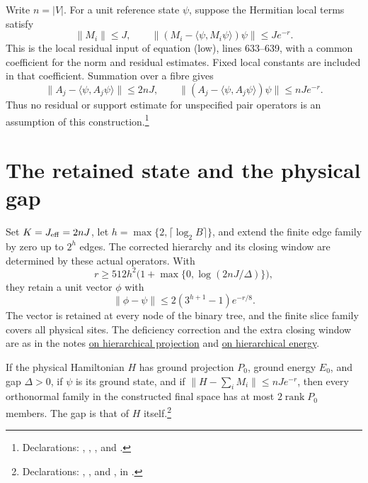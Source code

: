 \documentclass{article}
\begin{document}
Write $n=|V|$. For a unit reference state $\psi$, suppose the Hermitian
local terms satisfy
\[
 \|M_i\|\le J,\qquad
 \|(M_i-\langle\psi,M_i\psi\rangle)\psi\|\le Je^{-r}.
\]
This is the local residual input of equation (low), lines 633--639, with
a common coefficient for the norm and residual estimates. Fixed local
constants are included in that coefficient. Summation over a fibre gives
\[
 \|A_j-\langle\psi,A_j\psi\rangle\|\le2nJ,
 \qquad
 \|(A_j-\langle\psi,A_j\psi\rangle)\psi\|\le nJe^{-r}.
\]
Thus no residual or support estimate for unspecified pair operators is
an assumption of this construction.\footnote{Declarations:
,
,
, and
.}

\section{The retained state and the physical gap}

Set $K=J_{\rm eff}=2nJ$, let
$h=\max\{2,\lceil\log_2 B\rceil\}$, and extend the finite edge family by
zero up to $2^h$ edges. The corrected hierarchy and its closing window
are determined by these actual operators. With
\[
 r\ge512h^2\bigl(1+\max\{0,\log(2nJ/\Delta)\}\bigr),
\]
they retain a unit vector $\phi$ with
\[
 \|\phi-\psi\|\le2(3^{h+1}-1)e^{-r/8}.
\]
The vector is retained at every node of the binary tree, and the finite
slice family covers all physical sites. The deficiency correction and
the extra closing window are as in the notes
\href{hastings05_hierarchical_projection.pdf}{on hierarchical projection}
and \href{hastings05_hierarchical_energy.pdf}{on hierarchical energy}.

If the physical Hamiltonian $H$ has ground projection $P_0$, ground
energy $E_0$, and gap $\Delta>0$, if $\psi$ is its ground state, and if
$\|H-\sum_iM_i\|\le nJe^{-r}$, then every orthonormal family in the
constructed final space has at most $2\operatorname{rank}P_0$ members.
The gap is that of $H$ itself.\footnote{Declarations:
,
, and
,
in .}
\end{document}
